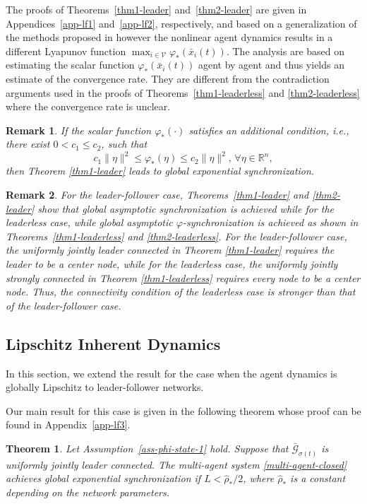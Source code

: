 \documentclass[a4paper, 11pt]{article}
\newtheorem{theorem}{Theorem}
\newtheorem{remark}{Remark}
\def\R{\mathbb{R}}
\begin{document}
The proofs of Theorems~\ref{thm1-leader} and~\ref{thm2-leader} are given in Appendices~\ref{app-lf1} and~\ref{app-lf2}, respectively, and based on a generalization of the methods proposed in
\cite{moreau,shi-johansson-siam} however the nonlinear agent dynamics results in a different Lyapunov function $\max_{i \in \mathcal{V}} \varphi_*(\bar{x}_i(t))$. The analysis are based on estimating the scalar function $\varphi_*(\bar{x}_i(t))$ agent by agent and thus yields an estimate of the convergence rate. They are different from the contradiction arguments used in the proofs of Theorems~\ref{thm1-leaderless} and \ref{thm2-leaderless} where the convergence rate is unclear.

\begin{remark}\label{remark-exponential}
If the scalar function $\varphi_*(\cdot)$ satisfies an additional condition, i.e.,
there exist $0<c_1 \leq c_2$, such that
\[
c_1\|\eta\|^2 \leq \varphi_*(\eta) \leq c_2\|\eta\|^2, \, \forall \eta \in {\R}^n,
\]
then Theorem \ref{thm1-leader} leads to global exponential synchronization.
\end{remark}

\begin{remark}
For the leader-follower case, Theorems~\ref{thm1-leader} and \ref{thm2-leader} show that
global asymptotic synchronization is achieved while for the leaderless case, while global asymptotic $\varphi$-synchronization is achieved as shown in Theorems~\ref{thm1-leaderless} and \ref{thm2-leaderless}. For the leader-follower case,
the uniformly jointly leader connected in Theorem \ref{thm1-leader}
requires the leader to be a center node, while for the leaderless case, the uniformly jointly strongly connected
in Theorem \ref{thm1-leaderless} requires every node to be a center node.
Thus, the connectivity condition of the leaderless case is stronger than that of the leader-follower case.
\end{remark}


\subsection{Lipschitz Inherent Dynamics}

In this section, we extend the result for the case when the agent dynamics is globally Lipschitz to leader-follower networks.

Our main result for this case is given in the following theorem whose proof can be found in Appendix~\ref{app-lf3}.

\begin{theorem}\label{unstable-thm2}
Let Assumption~\ref{ass-phi-state-1} hold. Suppose that $\bar{\mathcal{G}}_{\sigma(t)}$ is uniformly jointly leader connected.
The multi-agent system \eqref{multi-agent-closed} achieves global exponential synchronization if $L< \hat{\rho}_*/2$, where $\hat{\rho}_*$ is a constant depending on the
network parameters.
\end{theorem}
\end{document}
